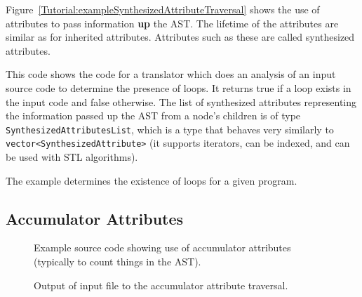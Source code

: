   Figure~\ref{Tutorial:exampleSynthesizedAttributeTraversal} shows the use of
attributes to pass information {\bf up} the AST.  The lifetime of the attributes
are similar as for inherited attributes.  Attributes such as these are called
synthesized attributes.  

   This code shows the code for a translator which does an analysis of 
an input source code to determine the presence of loops.  It returns true if
a loop exists in the input code and false otherwise.  The list of synthesized
attributes representing the information passed up the AST from a node's
children is of type {\tt SynthesizedAttributesList}, which is a type that
behaves very similarly to {\tt vector<SynthesizedAttribute>} (it supports
iterators, can be indexed, and can be used with STL algorithms).

   The example determines the existence of loops for a given program.



\clearpage
\subsection{Accumulator Attributes}

\begin{figure}[!h]
{\indent
{\mySmallFontSize


\begin{latexonly}
   
\end{latexonly}

\begin{htmlonly}
   
\end{htmlonly}

}
}
\caption{Example source code showing use of accumulator attributes (typically to count
    things in the AST).}
\label{Tutorial:exampleAccumulatorAttributeTraversal}
\end{figure}


\begin{figure}[!h]
{\indent
{\mySmallFontSize


\begin{latexonly}
   
\end{latexonly}

\begin{htmlonly}
   
\end{htmlonly}

}
}
\caption{Output of input file to the accumulator attribute traversal.}
\label{Tutorial:exampleOutput_AccumulatorAttributeTraversal}
\end{figure}

